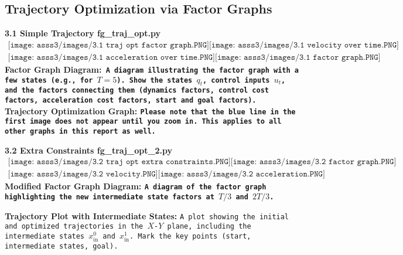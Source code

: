 \documentclass{article}
\begin{document}
\subsection*{Trajectory Optimization via Factor Graphs}
\bfseries{3.1 Simple Trajectory}
\bfseries{\newline fg\_traj\_opt.py}
\begin{align*}
    \texttt{[image: asss3/images/3.1 traj opt factor graph.PNG]}
    \texttt{[image: asss3/images/3.1 velocity over time.PNG]}
\end{align*}
\begin{align*}
    \texttt{[image: asss3/images/3.1 acceleration over time.PNG]}
    \texttt{[image: asss3/images/3.1 factor graph.PNG]}
\end{align*}
\textbf{Factor Graph Diagram:}\texttt{ A diagram illustrating the factor graph with a few states (e.g., for \( T = 5 \)). Show the states \( q_t \), control inputs \( u_t \), and the factors connecting them (dynamics factors, control cost factors, acceleration cost factors, start and goal factors). }
\textbf{\newline Trajectory Optimization Graph: }\texttt{Please note that the blue line in the first image does not appear until you zoom in. This applies to all other graphs in this report as well.\newline}


\noindent\bfseries{3.2 Extra Constraints}
\bfseries{\newline fg\_traj\_opt\_2.py}
\begin{align*}
    \texttt{[image: asss3/images/3.2 traj opt extra constraints.PNG]}
    \texttt{[image: asss3/images/3.2 factor graph.PNG]}
\end{align*}
\begin{align*}
    \texttt{[image: asss3/images/3.2 velocity.PNG]}
    \texttt{[image: asss3/images/3.2 acceleration.PNG]}
\end{align*}
\textbf{Modified Factor Graph Diagram:} 
\texttt{A diagram of the factor graph highlighting the new intermediate state factors at \( T/3 \) and \( 2T/3 \).}

\textbf{\newline Trajectory Plot with Intermediate States:} 
\texttt{A plot showing the initial and optimized trajectories in the \( X \)-\( Y \) plane, including the intermediate states \( x_{\text{in}}^0 \) and \( x_{\text{in}}^1 \). Mark the key points (start, intermediate states, goal).}
\end{document}
